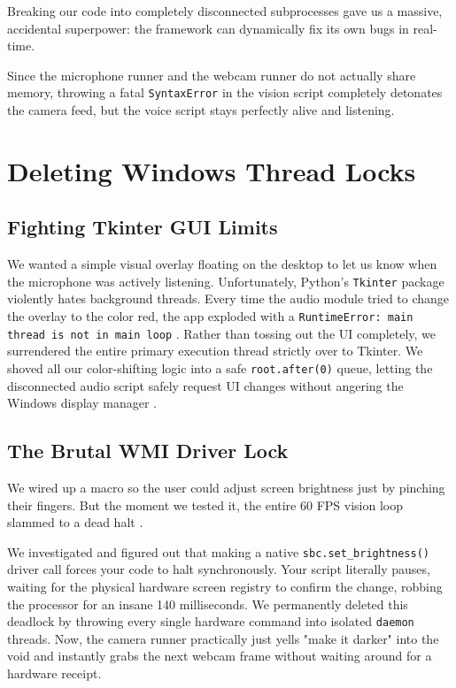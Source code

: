 \documentclass[conference]{IEEEtran}
\begin{document}
Breaking our code into completely disconnected subprocesses gave us a massive, accidental superpower: the framework can dynamically fix its own bugs in real-time.

Since the microphone runner and the webcam runner do not actually share memory, throwing a fatal \texttt{SyntaxError} in the vision script completely detonates the camera feed, but the voice script stays perfectly alive and listening.




\section{Deleting Windows Thread Locks}

\subsection{Fighting Tkinter GUI Limits}
We wanted a simple visual overlay floating on the desktop to let us know when the microphone was actively listening. Unfortunately, Python's \texttt{Tkinter} package violently hates background threads. Every time the audio module tried to change the overlay to the color red, the app exploded with a \texttt{RuntimeError: main thread is not in main loop} \cite{b17}. Rather than tossing out the UI completely, we surrendered the entire primary execution thread strictly over to Tkinter. We shoved all our color-shifting logic into a safe \texttt{root.after(0)} queue, letting the disconnected audio script safely request UI changes without angering the Windows display manager \cite{b19}.

\subsection{The Brutal WMI Driver Lock}
We wired up a macro so the user could adjust screen brightness just by pinching their fingers. But the moment we tested it, the entire 60 FPS vision loop slammed to a dead halt \cite{b6}.

We investigated and figured out that making a native \texttt{sbc.set\_brightness()} driver call forces your code to halt synchronously. Your script literally pauses, waiting for the physical hardware screen registry to confirm the change, robbing the processor for an insane 140 milliseconds. We permanently deleted this deadlock by throwing every single hardware command into isolated \texttt{daemon} threads. Now, the camera runner practically just yells "make it darker" into the void and instantly grabs the next webcam frame without waiting around for a hardware receipt.
\end{document}
